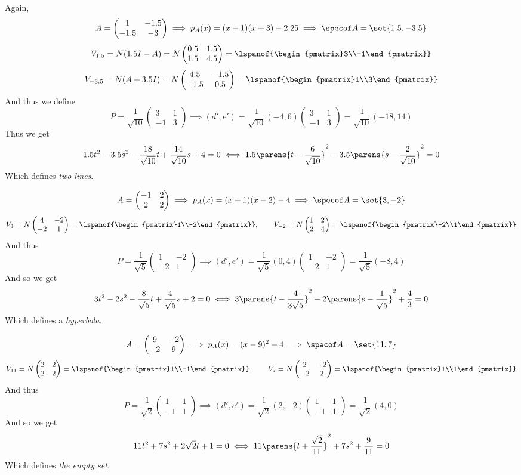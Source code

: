 \documentclass[10pt]{article}
\def\pmat#1{\begin{pmatrix} #1 \end{pmatrix}}
\def\pmat#1{\begin{pmatrix}#1\end{pmatrix}}
\begin{document}
        \item Again,
            \[ A = \pmat{1 & -1.5 \\ -1.5 & -3} \implies p_A(x) = (x-1)(x+3) - 2.25 \implies \specof A = \set{1.5, -3.5} \]
            \[ V_{1.5} = N(1.5I-A) = N\pmat{0.5 & 1.5 \\ 1.5 & 4.5} = \lspanof{\pmat{3\\-1}} \]
            \[ V_{-3.5} = N(A+3.5I) = N\pmat{4.5 & -1.5 \\ -1.5 & 0.5} = \lspanof{\pmat{1\\3}} \]
            And thus we define
            \[ P = \frac1{\sqrt{10}}\pmat{3 & 1 \\ -1 & 3} \implies (d',e') = \frac1{\sqrt{10}}(-4,6)\pmat{3 & 1 \\ -1 & 3} = \frac1{\sqrt{10}}(-18,14) \]
            Thus we get
            \[ 1.5t^2 - 3.5s^2 - \frac{18}{\sqrt{10}}t + \frac{14}{\sqrt{10}}s + 4 = 0 \iff 1.5\parens{t-\frac6{\sqrt{10}}}^2 - 3.5\parens{s-\frac2{\sqrt{10}}}^2 = 0 \]
            Which defines \emph{two lines}.

        \item
            \[ A = \pmat{-1 & 2 \\ 2 & 2} \implies p_A(x) = (x+1)(x-2)-4 \implies \specof A = \set{3,-2} \]
            \[ V_3 = N\pmat{4 & -2 \\ -2 & 1} = \lspanof{\pmat{1\\-2}},\qquad V_{-2} = N\pmat{1 & 2 \\ 2 & 4} = \lspanof{\pmat{-2\\1}} \]
            And thus
            \[ P = \frac1{\sqrt5}\pmat{1 & -2 \\ -2 & 1} \implies (d',e') = \frac1{\sqrt5}(0,4)\pmat{1 & -2 \\ -2 & 1} = \frac1{\sqrt5}(-8, 4) \]
            And so we get
            \[ 3t^2 - 2s^2 - \frac8{\sqrt5}t + \frac4{\sqrt5}s + 2 = 0 \iff 3\parens{t-\frac4{3\sqrt5}}^2 - 2\parens{s-\frac1{\sqrt5}}^2 + \frac43 = 0 \]
            Which defines a \emph{hyperbola}.

        \item
            \[ A = \pmat{9 & -2 \\ -2 & 9} \implies p_A(x) = (x-9)^2 - 4 \implies \specof A = \set{11,7} \]
            \[ V_{11} = N\pmat{2 & 2 \\ 2 & 2} = \lspanof{\pmat{1\\-1}},\qquad V_7 = N\pmat{2 & -2 \\ -2 & 2} = \lspanof{\pmat{1\\1}} \]
            And thus
            \[ P = \frac1{\sqrt2}\pmat{1 & 1 \\ -1 & 1} \implies (d',e') = \frac1{\sqrt2}(2,-2)\pmat{1 & 1 \\ -1 & 1} = \frac1{\sqrt2}(4,0) \]
            And so we get
            \[ 11t^2 + 7s^2 + 2\sqrt2t + 1 = 0 \iff 11\parens{t+\frac{\sqrt2}{11}}^2 + 7s^2 + \frac9{11} = 0 \]
            Which defines \emph{the empty set}.
\end{document}
